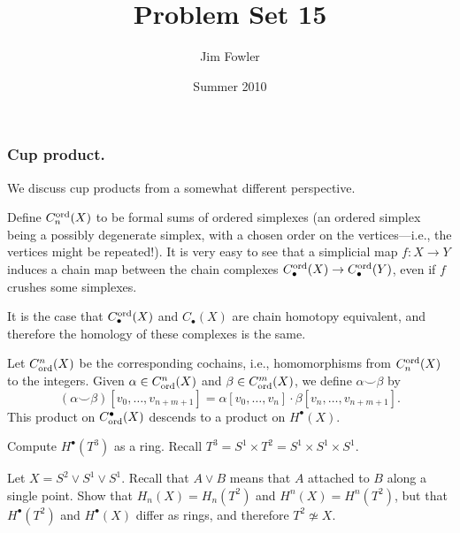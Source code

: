 \documentclass[12pt]{pset}
\title{Problem Set 15}
\author{Jim Fowler}
\date{Summer 2010}
\newcommand{\cupp}{\smallsmile}
\newcommand{\Ct}{C_{\mbox{\scriptsize ord}}}
\newcommand{\Chaint}{C^{\mbox{\scriptsize ord}}}
\begin{document}
\maketitle


\subsubsection*{Cup product.} We discuss cup products from a somewhat
different perspective.



\begin{definition*}
  Define $\Chaint_n(X)$ to be formal sums of ordered simplexes (an
  ordered simplex being a possibly degenerate simplex, with a chosen
  order on the vertices---i.e., the vertices might be repeated!).  It
  is very easy to see that a simplicial map $f : X \to Y$ induces a
  chain map between the chain complexes $\Chaint_\bullet(X) \to
  \Chaint_\bullet(Y)$, even if $f$ crushes some simplexes.

  It is the case that $\Chaint_\bullet(X)$ and $C_\bullet(X)$ are
  chain homotopy equivalent, and therefore the homology of these
  complexes is the same.

  Let $\Ct^n(X)$ be the corresponding cochains, i.e., homomorphisms
  from $\Chaint_n(X)$ to the integers.
  Given $\alpha \in \Ct^n(X)$ and $\beta \in \Ct^m(X)$, we define $\alpha \cupp \beta$ by
  $$
  (\alpha \cupp \beta) [v_0,\ldots,v_{n+m+1}] = \alpha [v_0,\ldots,v_n] \cdot \beta [v_n,\ldots,v_{n+m+1}].
  $$
  This product on $\Ct^\bullet(X)$ descends to a product on $H^\bullet(X)$.
\end{definition*}

\begin{problem}
  Compute $H^\bullet(T^3)$ as a ring. Recall $T^3 = S^1 \times T^2 =
  S^1 \times S^1 \times S^1$.
\end{problem}

\begin{problem}
  Let $X = S^2 \vee S^1 \vee S^1$.  Recall that $A \vee B$ means that
  $A$ attached to $B$ along a single point.  Show that $H_n(X) =
  H_n(T^2)$ and $H^n(X) = H^n(T^2)$, but that $H^\bullet(T^2)$ and
  $H^\bullet(X)$ differ as rings, and therefore $T^2 \not\simeq X$.
\end{problem}
\end{document}
